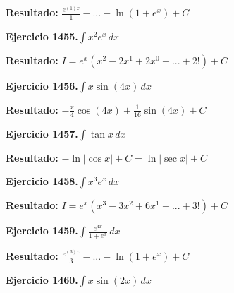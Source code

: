 \documentclass[10pt,a4paper]{article}
\begin{document}
\begin{solbox}
\textbf{Resultado:} \(\displaystyle \frac{e^{(1)x}}{1} - ... - \ln(1+e^x) + C\)
\end{solbox}

\begin{ejbox}
\textbf{Ejercicio 1455.}\quad $\int x^{2} e^x\,dx$
\end{ejbox}

\begin{solbox}
\textbf{Resultado:} \(\displaystyle I = e^x(x^{2} - 2x^{1} + 2x^{0} - ... + 2!) + C\)
\end{solbox}

\newpage
\begin{ejbox}
\textbf{Ejercicio 1456.}\quad $\int x \sin(4x)\,dx$
\end{ejbox}

\begin{solbox}
\textbf{Resultado:} \(\displaystyle -\frac{x}{4}\cos(4x) + \frac{1}{16}\sin(4x) + C\)
\end{solbox}

\begin{ejbox}
\textbf{Ejercicio 1457.}\quad $\int \tan x\,dx$
\end{ejbox}

\begin{solbox}
\textbf{Resultado:} \(\displaystyle -\ln|\cos x| + C = \ln|\sec x| + C\)
\end{solbox}

\begin{ejbox}
\textbf{Ejercicio 1458.}\quad $\int x^{3} e^x\,dx$
\end{ejbox}

\begin{solbox}
\textbf{Resultado:} \(\displaystyle I = e^x(x^{3} - 3x^{2} + 6x^{1} - ... + 3!) + C\)
\end{solbox}

\newpage
\begin{ejbox}
\textbf{Ejercicio 1459.}\quad $\int \frac{e^{4x}}{1+e^{x}}\,dx$
\end{ejbox}

\begin{solbox}
\textbf{Resultado:} \(\displaystyle \frac{e^{(3)x}}{3} - ... - \ln(1+e^x) + C\)
\end{solbox}

\begin{ejbox}
\textbf{Ejercicio 1460.}\quad $\int x \sin(2x)\,dx$
\end{ejbox}
\end{document}
